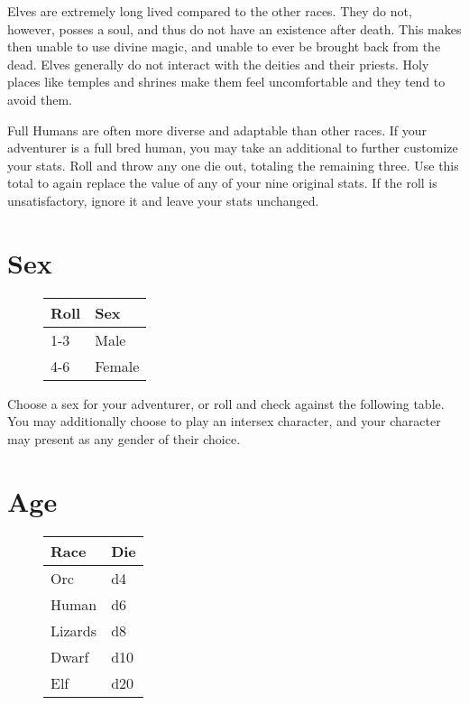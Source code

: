 \begin{multicols*}{2}
Elves are extremely long lived compared to the other races. They do not, however, posses a soul, and thus do not have an existence after death. This makes then unable to use divine magic, and unable to ever be brought back from the dead. Elves generally do not interact with the deities and their priests. Holy places like temples and shrines make them feel uncomfortable and they tend to avoid them.

Full Humans are often more diverse and adaptable than other races. If your adventurer is a full bred human, you may take an additional  to further customize your stats. Roll  and throw any one die out, totaling the remaining three. Use this total to again replace the value of any of your nine original stats. If the roll is unsatisfactory, ignore it and leave your stats unchanged.
\section{Sex}
\begin{wrapfigure}[5]{l}[0pt]{60pt}
\begin{normbox}
\small
\begin{tabular}{@{}l l}
\textbf{Roll} & \textbf{Sex}\\
\midrule
1-3 & Male\\
4-6 & Female
\end{tabular}
\end{normbox}
\end{wrapfigure}
Choose a sex for your adventurer, or roll  and check against the following table. You may additionally choose to play an intersex character, and your character may present as any gender of their choice.
\section{Age}
\begin{wrapfigure}[6]{l}[0pt]{60pt}
\begin{normbox}
\small
{}
\begin{tabular}{@{}l l}
\textbf{Race} & \textbf{Die}\\
\midrule
Orc & d4\\
Human & d6\\
Lizards &  d8\\
Dwarf & d10\\
Elf &  d20\\
\end{tabular}
\normalsize
\end{normbox}
\end{wrapfigure}


\end{multicols*}
